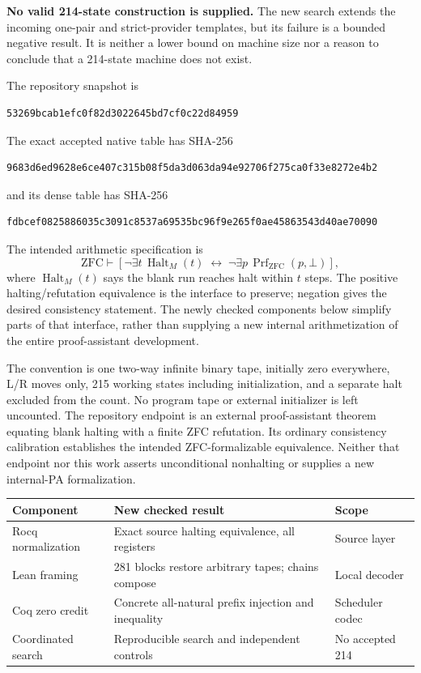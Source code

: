 \documentclass[11pt]{article}
\newcommand{\Halt}{\operatorname{Halt}}
\begin{document}
\textbf{No valid 214-state construction is supplied.} The new search extends the
incoming one-pair and strict-provider templates, but its failure is a bounded
negative result. It is neither a lower bound on machine size nor a reason to
conclude that a 214-state machine does not exist.

The repository snapshot is
\begin{Verbatim}[fontsize=\small]
53269bcab1efc0f82d3022645bd7cf0c22d84959
\end{Verbatim}
The exact accepted native table has SHA-256
\begin{Verbatim}[fontsize=\small]
9683d6ed9628e6ce407c315b08f5da3d063da94e92706f275ca0f33e8272e4b2
\end{Verbatim}
and its dense table has SHA-256
\begin{Verbatim}[fontsize=\small]
fdbcef0825886035c3091c8537a69535bc96f9e265f0ae45863543d40ae70090
\end{Verbatim}
The intended arithmetic specification is
\[
 \mathrm{ZFC}\vdash
 \left[\neg\exists t\,\Halt_M(t)
 \;\longleftrightarrow\;
 \neg\exists p\,\operatorname{Prf}_{\mathrm{ZFC}}(p,\bot)\right],
\]
where $\Halt_M(t)$ says the blank run reaches halt within $t$ steps. The
positive halting/refutation equivalence is the interface to preserve; negation
gives the desired consistency statement. The newly checked components below
simplify parts of that interface, rather than supplying a new internal
arithmetization of the entire proof-assistant development.

The convention is one two-way infinite binary tape, initially zero everywhere,
L/R moves only, 215 working states including initialization, and a separate
halt excluded from the count. No program tape or external initializer is
left uncounted. The repository endpoint is an external proof-assistant theorem
equating blank halting with a finite ZFC refutation. Its ordinary consistency
calibration establishes the intended ZFC-formalizable equivalence. Neither that
endpoint nor this work asserts unconditional nonhalting or supplies a new
internal-PA formalization.

\begin{center}
\begin{tabularx}{\textwidth}{@{}lXl@{}}
\toprule
Component & New checked result & Scope\\
\midrule
Rocq normalization & Exact source halting equivalence, all registers & Source layer\\
Lean framing & 281 blocks restore arbitrary tapes; chains compose & Local decoder\\
Coq zero credit & Concrete all-natural prefix injection and inequality & Scheduler codec\\
Coordinated search & Reproducible search and independent controls & No accepted 214\\
\bottomrule
\end{tabularx}
\end{center}
\end{document}
